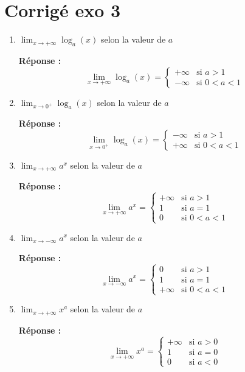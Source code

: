 \section*{Corrigé exo 3}


\begin{enumerate}
\item $\lim _{x \rightarrow+\infty} \log _a(x)$ selon la valeur de $a$
  
  \textbf{Réponse :}
  \[
  \lim _{x \rightarrow+\infty} \log _a(x) = 
  \begin{cases}
  +\infty & \text{si } a > 1 \\
  -\infty & \text{si } 0 < a < 1
  \end{cases}
  \]

\item $\lim _{x \rightarrow 0^{+}} \log _a(x)$ selon la valeur de $a$
  
  \textbf{Réponse :}
  \[
  \lim _{x \rightarrow 0^{+}} \log _a(x) = 
  \begin{cases}
  -\infty & \text{si } a > 1 \\
  +\infty & \text{si } 0 < a < 1
  \end{cases}
  \]

\item $\lim _{x \rightarrow+\infty} a^x$ selon la valeur de $a$
  
  \textbf{Réponse :}
  \[
  \lim _{x \rightarrow+\infty} a^x = 
  \begin{cases}
  +\infty & \text{si } a > 1 \\
  1 & \text{si } a = 1 \\
  0 & \text{si } 0 < a < 1
  \end{cases}
  \]

\item $\lim _{x \rightarrow-\infty} a^x$ selon la valeur de $a$
  
  \textbf{Réponse :}
  \[
  \lim _{x \rightarrow-\infty} a^x = 
  \begin{cases}
  0 & \text{si } a > 1 \\
  1 & \text{si } a = 1 \\
  +\infty & \text{si } 0 < a < 1
  \end{cases}
  \]

\item $\lim _{x \rightarrow+\infty} x^a$ selon la valeur de $a$
  
  \textbf{Réponse :}
  \[
  \lim _{x \rightarrow+\infty} x^a = 
  \begin{cases}
  +\infty & \text{si } a > 0 \\
  1 & \text{si } a = 0 \\
  0 & \text{si } a < 0
  \end{cases}
  \]


\end{enumerate}
